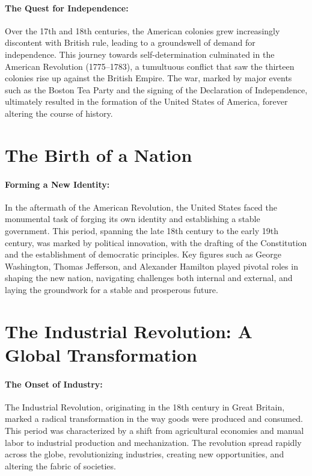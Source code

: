 \documentclass[a4paper,12pt]{book}
\begin{document}
\paragraph{The Quest for Independence:}
Over the 17th and 18th centuries, the American colonies grew increasingly discontent with British rule, leading to a groundswell of demand for independence. This journey towards self-determination culminated in the American Revolution (1775–1783), a tumultuous conflict that saw the thirteen colonies rise up against the British Empire. The war, marked by major events such as the Boston Tea Party and the signing of the Declaration of Independence, ultimately resulted in the formation of the United States of America, forever altering the course of history.

\section*{The Birth of a Nation}

\paragraph{Forming a New Identity:}
In the aftermath of the American Revolution, the United States faced the monumental task of forging its own identity and establishing a stable government. This period, spanning the late 18th century to the early 19th century, was marked by political innovation, with the drafting of the Constitution and the establishment of democratic principles. Key figures such as George Washington, Thomas Jefferson, and Alexander Hamilton played pivotal roles in shaping the new nation, navigating challenges both internal and external, and laying the groundwork for a stable and prosperous future.

\section*{The Industrial Revolution: A Global Transformation}

\paragraph{The Onset of Industry:}
The Industrial Revolution, originating in the 18th century in Great Britain, marked a radical transformation in the way goods were produced and consumed. This period was characterized by a shift from agricultural economies and manual labor to industrial production and mechanization. The revolution spread rapidly across the globe, revolutionizing industries, creating new opportunities, and altering the fabric of societies.
\end{document}

